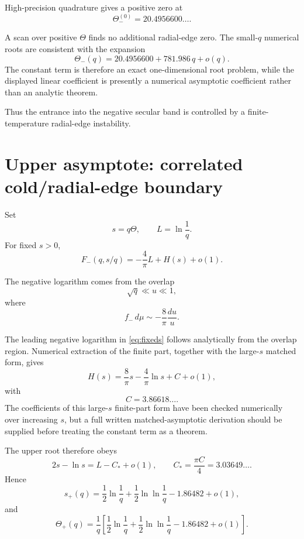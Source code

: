 \documentclass[11pt]{article}
\theoremstyle{remark}
\newcommand{\1}{\mathbf 1}
\begin{document}
High-precision quadrature gives a positive zero at
\begin{equation}
\boxed{
\Theta_-^{(0)}
=
20.4956600\ldots.
}
\end{equation}

A scan over positive \(\Theta\) finds no additional radial-edge zero.  The
small-\(q\) numerical roots are consistent with the expansion
\begin{equation}
\boxed{
\Theta_-(q)
=
20.4956600
+
781.986\,q
+
o(q).
}
\label{eq:lowerbranch}
\end{equation}
The constant term is therefore an exact one-dimensional root problem, while
the displayed linear coefficient is presently a numerical asymptotic
coefficient rather than an analytic theorem.

Thus the entrance into the negative secular band is controlled by a
finite-temperature radial-edge instability.

\section{Upper asymptote: correlated cold/radial-edge boundary}

Set
\[
s=q\Theta,
\qquad
L=\ln\frac1q.
\]
For fixed $s>0$,
\begin{equation}
\boxed{
F_-(q,s/q)
=
-\frac4\pi L
+
H(s)
+
o(1).
}
\label{eq:fixeds}
\end{equation}

The negative logarithm comes from the overlap
\[
\sqrt q\ll u\ll1,
\]
where
\[
f_-\,d\mu
\sim
-\frac8\pi\frac{du}{u}.
\]

The leading negative logarithm in \eqref{eq:fixeds} follows analytically
from the overlap region.  Numerical extraction of the finite part, together
with the large-\(s\) matched form, gives
\begin{equation}
\boxed{
H(s)
=
\frac8\pi s
-
\frac4\pi\ln s
+
C
+
o(1),
}
\end{equation}
with
\[
C
=
3.86618\ldots.
\]
The coefficients of this large-\(s\) finite-part form have been checked
numerically over increasing \(s\), but a full written matched-asymptotic
derivation should be supplied before treating the constant term as a theorem.

The upper root therefore obeys
\[
2s-\ln s
=
L-C_*+o(1),
\qquad
C_*=\frac{\pi C}{4}=3.03649\ldots.
\]
Hence
\begin{equation}
\boxed{
s_+(q)
=
\frac12\ln\frac1q
+
\frac12\ln\ln\frac1q
-
1.86482
+
o(1),
}
\end{equation}
and
\begin{equation}
\boxed{
\Theta_+(q)
=
\frac1q
\left[
\frac12\ln\frac1q
+
\frac12\ln\ln\frac1q
-
1.86482
+
o(1)
\right].
}
\label{eq:upperbranch}
\end{equation}
\end{document}
